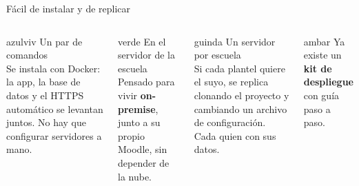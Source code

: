 \begin{frame}{F\'acil de instalar y de replicar}
\vspace{0.25cm}
\begin{columns}[T]
\begin{tarjetabox}{azulviv}
{\demi\color{azulviv}Un par de comandos}\\[3pt]
Se instala con Docker: la app, la base de datos y el HTTPS autom\'atico se levantan
juntos. No hay que configurar servidores a mano.
\end{tarjetabox}
\begin{tarjetabox}{verde}
{\demi\color{verde}En el servidor de la escuela}\\[3pt]
Pensado para vivir \textbf{on-premise}, junto a su propio Moodle, sin depender de la nube.
\end{tarjetabox}
\begin{tarjetabox}{guinda}
{\demi\color{guinda}Un servidor por escuela}\\[3pt]
Si cada plantel quiere el suyo, se replica clonando el proyecto y cambiando un
archivo de configuraci\'on. Cada quien con sus datos.
\end{tarjetabox}
\begin{calloutbox}{ambar}
\demi Ya existe un \textbf{kit de despliegue} con gu\'ia paso a paso.
\end{calloutbox}
\end{columns}
\end{frame}

